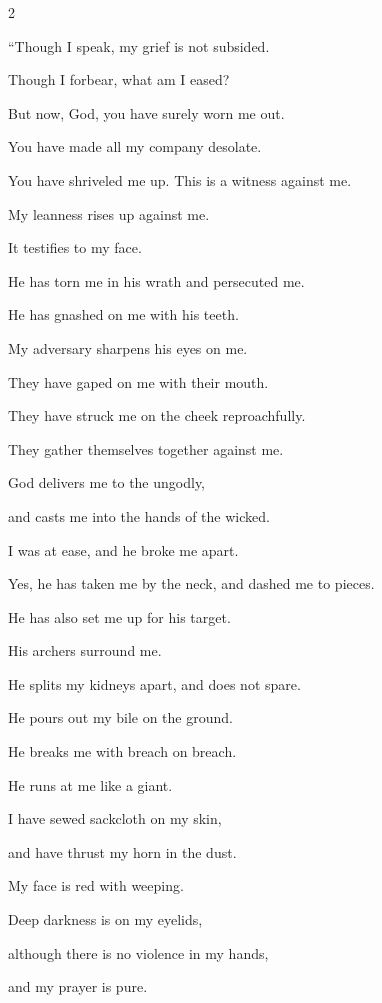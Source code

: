 \begin{multicols}{2}
	\vspace{\baselineskip}
	
	\myverse{}“Though I speak, my grief is not subsided.
	
	Though I forbear, what am I eased?
	
	\myverse{}But now, God, you have surely worn me out.
	
	You have made all my company desolate.
	
	\myverse{}You have shriveled me up. This is a witness against me.
	
	My leanness rises up against me.
	
	It testifies to my face.
	
	\myverse{}He has torn me in his wrath and persecuted me.
	
	He has gnashed on me with his teeth.
	
	My adversary sharpens his eyes on me.
	
	\myverse{}They have gaped on me with their mouth.
	
	They have struck me on the cheek reproachfully.
	
	They gather themselves together against me.
	
	\myverse{}God delivers me to the ungodly,
	
	and casts me into the hands of the wicked.
	
	\myverse{}I was at ease, and he broke me apart.
	
	Yes, he has taken me by the neck, and dashed me to pieces.
	
	He has also set me up for his target.
	
	\myverse{}His archers surround me.
	
	He splits my kidneys apart, and does not spare.
	
	He pours out my bile on the ground.
	
	\myverse{}He breaks me with breach on breach.
	
	He runs at me like a giant.
	
	\myverse{}I have sewed sackcloth on my skin,
	
	and have thrust my horn in the dust.
	
	\myverse{}My face is red with weeping.
	
	Deep darkness is on my eyelids,
	
	\myverse{}although there is no violence in my hands,
	
	and my prayer is pure.
	
	\vspace{\baselineskip}
	

\end{multicols}

